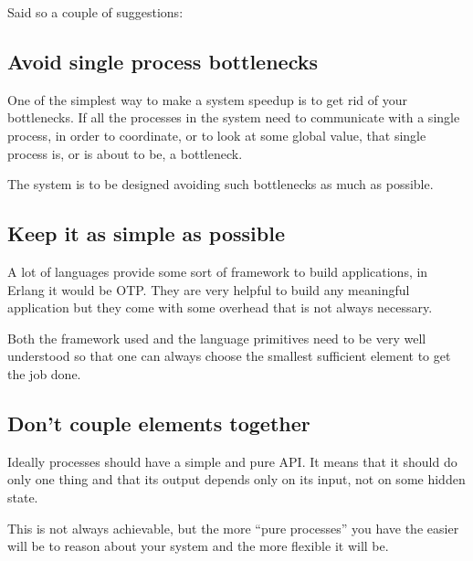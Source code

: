 \documentclass[12pt]{article} %
\begin{document}
Said so a couple of suggestions:

	\subsection{Avoid single process bottlenecks}
	
One of the simplest way to make a system speedup is to get rid of your bottlenecks. If all the processes in the system need to communicate with a single process, in order to coordinate, or to look at some global value, that single process is, or is about to be, a bottleneck.

The system is to be designed avoiding such bottlenecks as much as possible.	

	\subsection{Keep it as simple as possible}

A lot of languages provide some sort of framework to build applications, in Erlang it would be OTP. They are very helpful to build any meaningful application but they come with some overhead that is not always necessary.

Both the framework used and the language primitives need to be very well understood so that one can always choose the smallest sufficient element to get the job done.

	\subsection{Don't couple elements together}

Ideally processes should have a simple and pure API. It means that it should do only one thing and that its output depends only on its input, not on some hidden state.

This is not always achievable, but the more ``pure processes'' you have the easier will be to reason about your system and the more flexible it will be.
\end{document}
